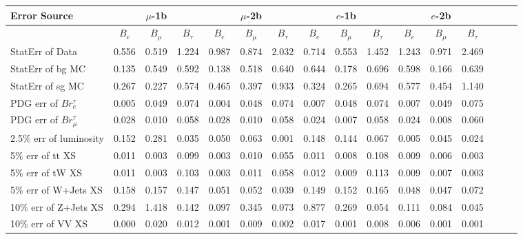 \begin{sidewaystable}[p]
  \small
  \renewcommand{\arraystretch}{1.5}

  \begin{tabular}{|l|ccc|ccc|ccc|ccc|ccc|}
  \hline
  Error Source & \multicolumn{3}{c|}{$\mu$-1b} & \multicolumn{3}{c|}{$\mu$-2b} & \multicolumn{3}{c|}{$e$-1b} & \multicolumn{3}{c|}{$e$-2b} \\
  \hline
                & $B_e$ & $B_\mu$ & $B_\tau$ & $B_e$ & $B_\mu$ & $B_\tau$ & $B_e$ & $B_\mu$ & $B_\tau$ & $B_e$ & $B_\mu$ & $B_\tau$ \\
  \hline
  StatErr of Data                            & 0.556 & 0.519 & 1.224 & 0.987 & 0.874 & 2.032 & 0.714 & 0.553 & 1.452 & 1.243 & 0.971 & 2.469 \\ 
  StatErr of bg MC                           & 0.135 & 0.549 & 0.592 & 0.138 & 0.518 & 0.640 & 0.644 & 0.178 & 0.696 & 0.598 & 0.166 & 0.639 \\ 
  StatErr of sg MC                           & 0.267 & 0.227 & 0.574 & 0.465 & 0.397 & 0.933 & 0.324 & 0.265 & 0.694 & 0.577 & 0.454 & 1.140 \\ 
  \hline
  PDG err of $Br^\tau_e$                     & 0.005 & 0.049 & 0.074 & 0.004 & 0.048 & 0.074 & 0.007 & 0.048 & 0.074 & 0.007 & 0.049 & 0.075 \\ 
  PDG err of $Br^\tau_\mu$                   & 0.028 & 0.010 & 0.058 & 0.028 & 0.010 & 0.058 & 0.024 & 0.007 & 0.058 & 0.024 & 0.008 & 0.060 \\ 
  2.5$\%$ err of luminosity                  & 0.152 & 0.281 & 0.035 & 0.050 & 0.063 & 0.001 & 0.148 & 0.144 & 0.067 & 0.005 & 0.045 & 0.024 \\ 
  5$\%$ err of tt XS                         & 0.011 & 0.003 & 0.099 & 0.003 & 0.010 & 0.055 & 0.011 & 0.008 & 0.108 & 0.009 & 0.006 & 0.003 \\ 
  5$\%$ err of tW XS                         & 0.011 & 0.003 & 0.103 & 0.003 & 0.011 & 0.058 & 0.012 & 0.009 & 0.113 & 0.009 & 0.007 & 0.003 \\ 
  5$\%$ err of W+Jets XS                     & 0.158 & 0.157 & 0.147 & 0.051 & 0.052 & 0.039 & 0.149 & 0.152 & 0.165 & 0.048 & 0.047 & 0.072 \\ 
  10$\%$ err of Z+Jets XS                    & 0.294 & 1.418 & 0.142 & 0.097 & 0.345 & 0.073 & 0.877 & 0.269 & 0.054 & 0.111 & 0.084 & 0.045 \\ 
  10$\%$ err of VV XS                        & 0.000 & 0.020 & 0.012 & 0.001 & 0.009 & 0.002 & 0.017 & 0.001 & 0.008 & 0.006 & 0.001 & 0.001 \\ 

\end{tabular}
\end{sidewaystable}
